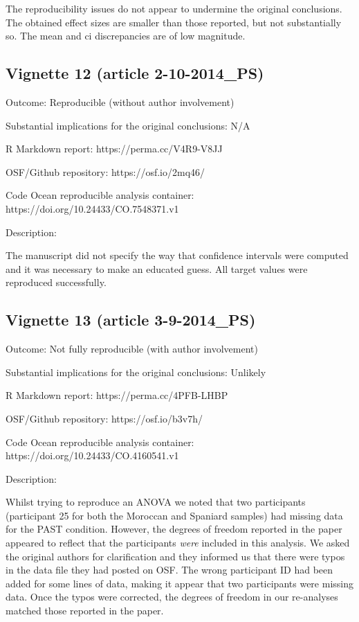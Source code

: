 \begin{appendix}
The reproducibility issues do not appear to undermine the original
conclusions. The obtained effect sizes are smaller than those reported,
but not substantially so. The mean and ci discrepancies are of low
magnitude.

\hypertarget{vignette-12-article-2-10-2014_ps}{%
\subsection{Vignette 12 (article
2-10-2014\_PS)}\label{vignette-12-article-2-10-2014_ps}}

Outcome: Reproducible (without author involvement)

Substantial implications for the original conclusions: N/A

R Markdown report: https://perma.cc/V4R9-V8JJ

OSF/Github repository: https://osf.io/2mq46/

Code Ocean reproducible analysis container:
https://doi.org/10.24433/CO.7548371.v1

Description:

The manuscript did not specify the way that confidence intervals were
computed and it was necessary to make an educated guess. All target
values were reproduced successfully.

\hypertarget{vignette-13-article-3-9-2014_ps}{%
\subsection{Vignette 13 (article
3-9-2014\_PS)}\label{vignette-13-article-3-9-2014_ps}}

Outcome: Not fully reproducible (with author involvement)

Substantial implications for the original conclusions: Unlikely

R Markdown report: https://perma.cc/4PFB-LHBP

OSF/Github repository: https://osf.io/b3v7h/

Code Ocean reproducible analysis container:
https://doi.org/10.24433/CO.4160541.v1

Description:

Whilst trying to reproduce an ANOVA we noted that two participants
(participant 25 for both the Moroccan and Spaniard samples) had missing
data for the PAST condition. However, the degrees of freedom reported in
the paper appeared to reflect that the participants \emph{were} included
in this analysis. We asked the original authors for clarification and
they informed us that there were typos in the data file they had posted
on OSF. The wrong participant ID had been added for some lines of data,
making it appear that two participants were missing data. Once the typos
were corrected, the degrees of freedom in our re-analyses matched those
reported in the paper.


\end{appendix}
